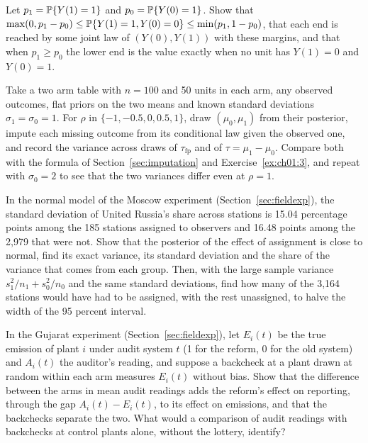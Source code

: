 \begin{exercises}
\item\label{ex:ch01:8} Let $p_1 = \mathbb{P}\{Y(1) = 1\}$ and $p_0 = \mathbb{P}\{Y(0) = 1\}$. Show that $\max(0, p_1 - p_0) \le \mathbb{P}\{Y(1) = 1, Y(0) = 0\} \le \min(p_1, 1 - p_0)$, that each end is reached by some joint law of $(Y(0), Y(1))$ with these margins, and that when $p_1 \ge p_0$ the lower end is the value exactly when no unit has $Y(1) = 0$ and $Y(0) = 1$.
\item\label{ex:ch01:9} Take a two arm table with $n = 100$ and 50 units in each arm, any observed outcomes, flat priors on the two means and known standard deviations $\sigma_1 = \sigma_0 = 1$. For $\rho$ in $\{-1, -0.5, 0, 0.5, 1\}$, draw $(\mu_0, \mu_1)$ from their posterior, impute each missing outcome from its conditional law given the observed one, and record the variance across draws of $\tau_{\mathrm{fp}}$ and of $\tau = \mu_1 - \mu_0$. Compare both with the formula of Section~\ref{sec:imputation} and Exercise~\ref{ex:ch01:3}, and repeat with $\sigma_0 = 2$ to see that the two variances differ even at $\rho = 1$.
\item\label{ex:ch01:moscow} In the normal model of the Moscow experiment (Section~\ref{sec:fieldexp}), the standard deviation of United Russia's share across stations is 15.04 percentage points among the 185 stations assigned to observers and 16.48 points among the 2,979 that were not. Show that the posterior of the effect of assignment is close to normal, find its exact variance, its standard deviation and the share of the variance that comes from each group. Then, with the large sample variance $s_1^2/n_1 + s_0^2/n_0$ and the same standard deviations, find how many of the 3,164 stations would have had to be assigned, with the rest unassigned, to halve the width of the 95 percent interval.
\item\label{ex:ch01:gujarat} In the Gujarat experiment (Section~\ref{sec:fieldexp}), let $E_i(t)$ be the true emission of plant $i$ under audit system $t$ (1 for the reform, 0 for the old system) and $A_i(t)$ the auditor's reading, and suppose a backcheck at a plant drawn at random within each arm measures $E_i(t)$ without bias. Show that the difference between the arms in mean audit readings adds the reform's effect on reporting, through the gap $A_i(t) - E_i(t)$, to its effect on emissions, and that the backchecks separate the two. What would a comparison of audit readings with backchecks at control plants alone, without the lottery, identify?
\end{exercises}
